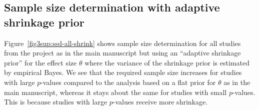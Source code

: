 \begin{subappendices}
\subsection{Sample size determination with adaptive shrinkage prior}
\label{sec3sup:ssdprotzko}
Figure~\ref{fig3sup:ssd-all-shrink} shows sample size determination for all
studies from the \citet{Protzko2020} project as in the main manuscript but using
an ``adaptive shrinkage prior'' for the effect size $\theta$ where the variance
of the shrinkage prior is estimated by empirical Bayes. We see that the required
sample size increases for studies with large $p$-values compared to the analysis
based on a flat prior for $\theta$ as in the main manuscript, whereas it stays
about the same for studies with small $p$-values. This is because studies with
large $p$-values receive more shrinkage.
\end{subappendices}



